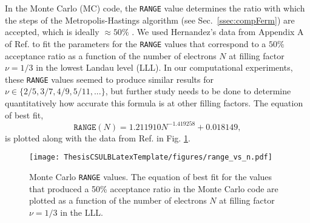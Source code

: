 \doublespacing

In the Monte Carlo (MC) code, the \texttt{RANGE} value determines the ratio with which the steps of the Metropolis-Hastings algorithm (see Sec.~\ref{ssec:compFerm}) are accepted, which is ideally $\approx50\%$ \cite{jain}. We used Hernandez's data from Appendix A of Ref. \cite{uriel} to fit the parameters for the \texttt{RANGE} values that correspond to a $50\%$ acceptance ratio as a function of the number of electrons $N$ at filling factor $\nu=1/3$ in the lowest Landau level (LLL). In our computational experiments, these \texttt{RANGE} values seemed to produce similar results for $\nu\in\{2/5,3/7,4/9,5/11,...\}$, but further study needs to be done to determine quantitatively how accurate this formula is at other filling factors. The equation of best fit,
\begin{equation}\label{range}
\texttt{RANGE}(N)=1.211910N^{−1.419258}+0.018149,
\end{equation}
is plotted along with the data from Ref. \cite{uriel} in Fig. \ref{fig:range_vs_n}.

\begin{figure}[H]
\begin{center}
\texttt{[image: ThesisCSULBLatexTemplate/figures/range\_vs\_n.pdf]}
\caption[Monte Carlo \texttt{RANGE} values.]{Monte Carlo \texttt{RANGE} values. The equation of best fit for the  values that produced a 50\% acceptance ratio in the Monte Carlo code are plotted as a function of the number of electrons $N$ at filling factor $\nu=1/3$ in the LLL.}
\label{fig:range_vs_n} 
\end{center}
\end{figure}

\singlespacing